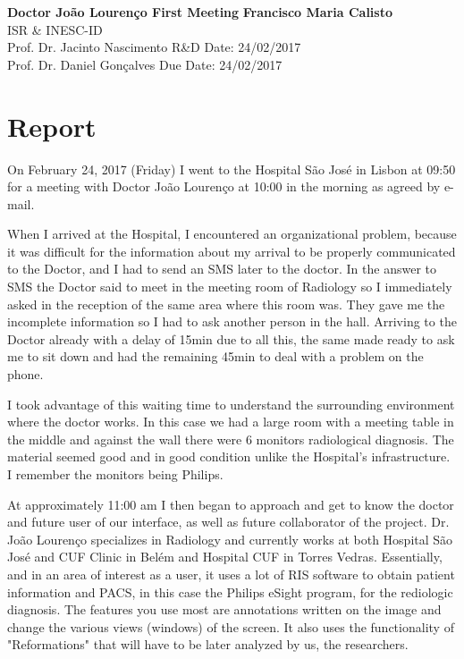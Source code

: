 \documentclass[a4paper, 11pt]{article}
\begin{document}
\noindent
\large\textbf{Doctor Jo\~{a}o Louren\c{c}o First Meeting} \hfill \textbf{Francisco Maria Calisto} \\
\normalsize ISR \& INESC-ID \\
Prof. Dr. Jacinto Nascimento \hfill R\&D Date: 24/02/2017 \\
Prof. Dr. Daniel Gon\c{c}alves \hfill Due Date: 24/02/2017

\section*{Report}

On February 24, 2017 (Friday) I went to the Hospital S\~{a}o Jos\'{e} in Lisbon at 09:50 for a meeting with Doctor João Lourenço at 10:00 in the morning as agreed by e-mail.

When I arrived at the Hospital, I encountered an organizational problem, because it was difficult for the information about my arrival to be properly communicated to the Doctor, and I had to send an SMS later to the doctor. In the answer to SMS the Doctor said to meet in the meeting room of Radiology so I immediately asked in the reception of the same area where this room was. They gave me the incomplete information so I had to ask another person in the hall. Arriving to the Doctor already with a delay of 15min due to all this, the same made ready to ask me to sit down and had the remaining 45min to deal with a problem on the phone.

I took advantage of this waiting time to understand the surrounding environment where the doctor works. In this case we had a large room with a meeting table in the middle and against the wall there were 6 monitors radiological diagnosis. The material seemed good and in good condition unlike the Hospital's infrastructure. I remember the monitors being Philips.

At approximately 11:00 am I then began to approach and get to know the doctor and future user of our interface, as well as future collaborator of the project. Dr. Jo\~{a}o Louren\c{c}o \cite{joaoLourenco} specializes in Radiology and currently works at both Hospital S\~{a}o Jos\'{e} and CUF Clinic in Belém and Hospital CUF in Torres Vedras. Essentially, and in an area of ​​interest as a user, it uses a lot of RIS software to obtain patient information and PACS, in this case the Philips eSight program, for the rediologic diagnosis. The features you use most are annotations written on the image and change the various views (windows) of the screen. It also uses the functionality of "Reformations" that will have to be later analyzed by us, the researchers.
\end{document}
